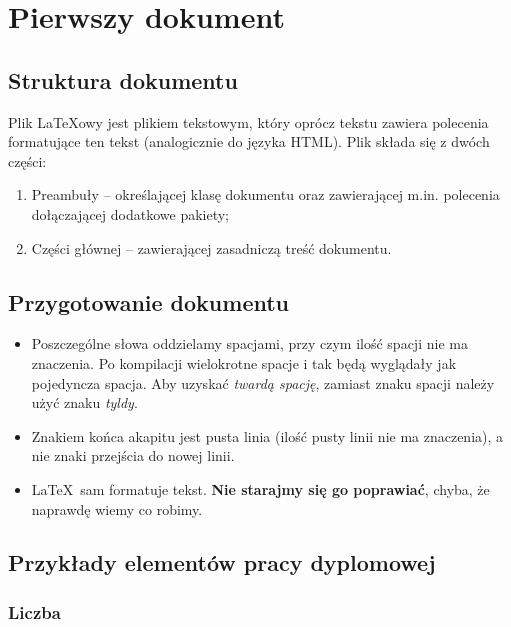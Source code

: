 \chapter{Pierwszy dokument}

\section{Struktura dokumentu}
\label{sec:strukturaDokumentu}

Plik \LaTeX owy jest plikiem tekstowym, który oprócz tekstu zawiera polecenia formatujące ten tekst (analogicznie do języka HTML). Plik składa się z dwóch części:
\begin{enumerate}%
	\item Preambuły -- określającej klasę dokumentu oraz zawierającej m.in. polecenia dołączającej dodatkowe pakiety;
	
	\item Części głównej -- zawierającej zasadniczą treść dokumentu.
\end{enumerate}

\section{Przygotowanie dokumentu}
\label{sec:przygotowanieDokumentu}

\begin{itemize}
	\item
	Poszczególne słowa oddzielamy spacjami, przy czym ilość spacji nie ma znaczenia.
	Po kompilacji wielokrotne spacje i tak będą wyglądały jak pojedyncza spacja.
	Aby uzyskać {\em twardą spację}, zamiast znaku spacji należy użyć znaku {\em
		tyldy}.
	
	\item
	Znakiem końca akapitu jest pusta linia (ilość pusty linii nie ma znaczenia), a
	nie znaki przejścia do nowej linii.
	
	\item
	\LaTeX~sam formatuje tekst. \textbf{Nie starajmy się go poprawiać}, chyba, że
	naprawdę wiemy co robimy.
\end{itemize} 

\section{Przykłady elementów pracy dyplomowej}

\subsection{Liczba}

